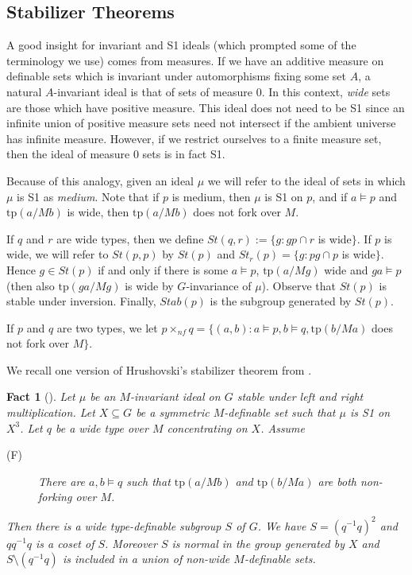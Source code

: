 \documentclass[12pt]{article}
\newtheorem{fact}[thm]{Fact}
\theoremstyle{definition}
\theoremstyle{mystyle}
\theoremstyle{remark}
\newcommand{\tp}{\mathrm{tp}}
\newcommand{\nf}{\times_{nf}}
\begin{document}
\subsection{Stabilizer Theorems}




A good insight for invariant and S1 ideals (which prompted some of
the terminology we use) comes from measures. If we have an
additive measure on definable sets which is invariant under
automorphisms fixing some set $A$, a natural $A$-invariant ideal
is that of sets of measure 0. In this context, \emph{wide} sets
are those which have positive measure. This ideal does not need to
be S1 since an infinite union of positive measure sets need not
intersect if the ambient universe has infinite measure. However,
if we restrict ourselves to a finite measure set, then the ideal
of measure 0 sets is in fact S1.

Because of this analogy, given an ideal $\mu$ we will refer to the
ideal of sets in which $\mu$ is S1 as \emph{medium}. Note that if
$p$ is medium, then $\mu$ is S1 on $p$, and if $a\models p$ and
$\tp(a/Mb)$ is wide, then $\tp(a/Mb)$ does not fork over $M$.

\bigskip

If $q$ and $r$ are wide types, then we define $St(q,r):=\{g : gp
\cap r$ is wide$\}$. If $p$ is wide, we will refer to $St(p,p)$ by
$St(p)$ and $St_r(p)= \{g : pg\cap p$ is wide$\}$. Hence $g\in
St(p)$ if and only if there is some $a\models p$, $\tp(a/Mg)$ wide
and $ga\models p$ (then also $\tp(ga/Mg)$ is wide by
$G$-invariance of $\mu$). Observe that $St(p)$ is stable under
inversion. Finally, $Stab(p)$ is the subgroup generated by
$St(p)$.

If $p$ and $q$ are two types, we let $p\nf q=\{(a,b) : a\models p, b\models q, \tp(b/Ma)$ does not fork over $M\}$.

\smallskip
We recall one version of Hrushovski's stabilizer theorem from
\cite{Hru12}.

\begin{fact}[\cite{Hru12}]\label{fact_stab}
Let $\mu$ be an $M$-invariant ideal on $G$ stable under left and right multiplication. Let $X\subseteq G$ be a symmetric $M$-definable set such that $\mu$ is S1 on $X^3$. Let $q$ be a wide type over $M$ concentrating on $X$. Assume

\begin{description}
\item[(F)] There are $a,b \models q$ such that $\tp(a/Mb)$ and $\tp(b/Ma)$ are both non-forking over $M$.
\end{description}
Then there is a wide type-definable subgroup $S$ of $G$. We have $S=(q^{-1}q)^2$ and $qq^{-1}q$ is a coset of $S$. Moreover $S$ is normal in the group generated by $X$ and $S\setminus (q^{-1}q)$ is included in a union of non-wide $M$-definable sets.
\end{fact}
\end{document}
